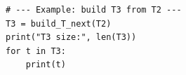 \documentclass[11pt]{amsart}
\numberwithin{equation}{section}
\begin{document}
\begin{appendices}
{{\begin{lstlisting}
# --- Example: build T3 from T2 ---
T3 = build_T_next(T2)
print("T3 size:", len(T3))
for t in T3:
    print(t)
\end{lstlisting}
}}

\end{appendices}



\end{document}
